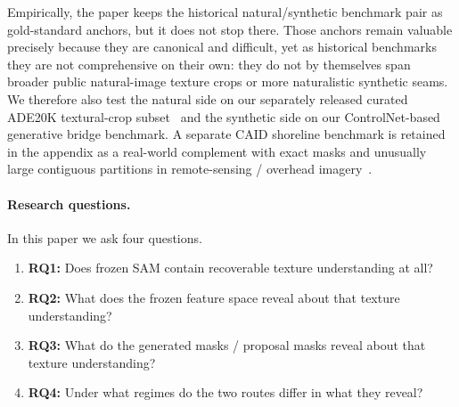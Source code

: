 

Empirically, the paper keeps the historical natural/synthetic benchmark pair as gold-standard anchors, but it does not stop there. Those anchors remain valuable precisely because they are canonical and difficult, yet as historical benchmarks they are not comprehensive on their own: they do not by themselves span broader public natural-image texture crops or more naturalistic synthetic seams. We therefore also test the natural side on our separately released curated ADE20K textural-crop subset~\cite{detextureade20k2026} and the synthetic side on our ControlNet-based generative bridge benchmark. A separate CAID shoreline benchmark is retained in the appendix as a real-world complement with exact masks and unusually large contiguous partitions in remote-sensing / overhead imagery~\cite{wang2025caid}.

\paragraph{Research questions.} In this paper we ask four questions.
\begin{enumerate}[leftmargin=1.4em]
\item \textbf{RQ1:} Does frozen SAM contain recoverable texture understanding at all?
\item \textbf{RQ2:} What does the frozen feature space reveal about that texture understanding?
\item \textbf{RQ3:} What do the generated masks / proposal masks reveal about that texture understanding?
\item \textbf{RQ4:} Under what regimes do the two routes differ in what they reveal?
\end{enumerate}

